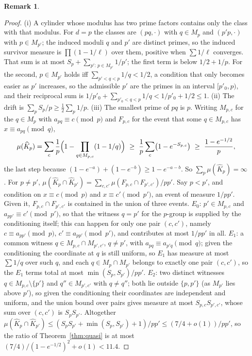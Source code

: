 \documentclass[11pt]{article}
\theoremstyle{plain}
\theoremstyle{definition}
\newtheorem{remark}[theorem]{Remark}
\newcommand{\Kh}{\widehat{K}}
\begin{document}
\begin{remark}
\begin{proof}
(i) A cylinder whose modulus has two prime factors contains only
the class with that modulus.  For $d=p$ the classes are
$(pq,\cdot)$ with $q\in M_p$ and $(p'p,\cdot)$ with $p\in
M_{p'}$; the induced moduli $q$ and $p'$ are distinct primes,
so the induced survivor measure is $\prod(1-1/\ell)$ over them,
positive when $\sum1/\ell$ converges.  That sum is at most
$S_p+\sum_{p':\,p\in M_{p'}}1/p'$; the first term is below
$1/2+1/p$.  For the second, $p\in M_{p'}$ holds iff
$\sum_{p'<q<p}1/q<1/2$, a condition that only becomes easier as
$p'$ increases, so the admissible $p'$ are the primes in an
interval $[p'_0,p)$, and their reciprocal sum is
$1/p'_0+\sum_{p'_0<q<p}1/q<1/p'_0+1/2\le1$.  (ii) The drift is $\sum_pS_p/p\ge\frac12\sum_p1/p$.
(iii) The smallest prime of $pq$ is $p$.  Writing $M_{p,c}$ for
the $q\in M_p$ with $a_{pq}\equiv c\pmod p$ and $F_{p,c}$ for
the event that some $q\in M_{p,c}$ has $x\equiv a_{pq}\pmod q$,
\[
\mu(\Kh_p)=\sum_c\frac1p\Bigl(1-\prod_{q\in M_{p,c}}(1-1/q)\Bigr)
\ \ge\ \frac1p\sum_c\bigl(1-e^{-S_{p,c}}\bigr)
\ \ge\ \frac{1-e^{-1/2}}{p},
\]
the last step because $(1-e^{-a})+(1-e^{-b})\ge1-e^{-a-b}$.  So
$\sum_p\mu(\Kh_p)=\infty$.  For $p\ne p'$,
$\mu(\Kh_p\cap \Kh_{p'})=\sum_{c,c'}\mu(F_{p,c}\cap F_{p',c'})/pp'$.
Say $p<p'$, and condition on $x\equiv c\pmod p$ and
$x\equiv c'\pmod{p'}$, an event of measure $1/pp'$.  Given it,
$F_{p,c}\cap F_{p',c'}$ is contained in the union of three
events.  $E_0$: $p'\in M_{p,c}$ and $a_{pp'}\equiv c'\pmod{p'}$,
so that the witness $q=p'$ for the $p$-group is supplied by the
conditioning itself; this can happen for only one pair $(c,c')$,
namely $c\equiv a_{pp'}\pmod p$, $c'\equiv a_{pp'}\pmod{p'}$, and
contributes at most $1/pp'$ in all.  $E_1$: a common witness
$q\in M_{p,c}\cap M_{p',c'}$, $q\ne p'$, with
$a_{pq}\equiv a_{p'q}\pmod q$; given the conditioning the
coordinate at $q$ is still uniform, so $E_1$ has measure at most
$\sum1/q$ over such $q$, and each $q\in M_p\cap M_{p'}$ belongs
to exactly one pair $(c,c')$, so the $E_1$ terms total at most
$\min(S_p,S_{p'})/pp'$.  $E_2$: two distinct witnesses
$q\in M_{p,c}\setminus\{p'\}$ and $q''\in M_{p',c'}$ with
$q\ne q''$; both lie outside $\{p,p'\}$ (as $M_{p'}$ lies above
$p'$), so given the conditioning their coordinates are
independent and uniform, and the union bound over pairs gives
measure at most $S_{p,c}S_{p',c'}$, whose sum over $(c,c')$ is
$S_pS_{p'}$.  Altogether
$\mu(\Kh_p\cap \Kh_{p'})\le(S_pS_{p'}+\min(S_p,S_{p'})+1)/pp'
\le(7/4+o(1))/pp'$, so the ratio of Theorem~\ref{thm:quasi} is
at most $(7/4)/(1-e^{-1/2})^2+o(1)<11.4$.
\end{proof}


\end{remark}
\end{document}
